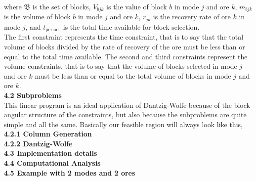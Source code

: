 \documentclass[11pt]{article}
\begin{document}
\noindent where $\mathfrak{B}$ is the set of blocks, $V_{b j k}$ is the value of block $b$ in mode $j$ and ore $k$, $m_{b j k}$ is the volume of block $b$ in mode $j$ and ore $k$, $r_{j k}$ is the recovery rate of ore $k$ in mode $j$, and $t_{\text {period }}$ is the total time available for block selection.
\\

\noindent The first constraint represents the time constraint, that is to say that the total volume of blocks divided by the rate of recovery of the ore must be less than or equal to the total time available. The second and third constraints represent the volume constraints, that is to say that the volume of blocks selected in mode $j$ and ore $k$ must be less than or equal to the total volume of blocks in mode $j$ and ore $k$.
\\

\noindent \textbf{4.2 Subproblems}
\\

\noindent This linear program is an ideal application of Dantzig-Wolfe because of the block angular structure of the constraints, but also because the subproblems are quite simple and all the same. Basically our feasible region will always look like this,
\\

\noindent \textbf{4.2.1 Column Generation}
\\

\noindent \textbf{4.2.2 Dantzig-Wolfe}
\\

\noindent \textbf{4.3 Implementation details}
\\

\noindent \textbf{4.4 Computational Analysis}
\\

\noindent \textbf{4.5 Example with 2 modes and 2 ores}
\\

\newpage 
\end{document}
